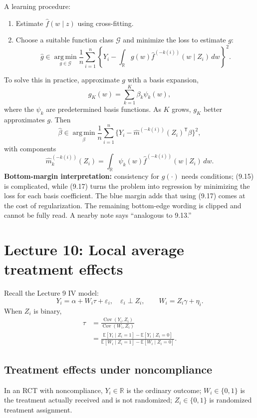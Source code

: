 A learning procedure:
\begin{enumerate}
 \item Estimate $\widehat f(w\mid z)$ using cross-fitting.
 \item Choose a suitable function class $\mathcal G$ and minimize the loss to estimate $g$:
 \[
 \widehat g\in\operatorname*{arg\,min}_{g\in\mathcal G}
 \frac1n\sum_{i=1}^n\left\{
 Y_i-\int_{\mathbb R}g(w)\widehat f^{(-k(i))}(w\mid Z_i)\,dw
 \right\}^{\!2}.\tag{9.16}
 \]
\end{enumerate}
To solve this in practice, approximate $g$ with a basis expansion,
\[
 g_K(w)=\sum_{k=1}^K\beta_k\psi_k(w),
\]
where the $\psi_k$ are predetermined basis functions. As $K$ grows, $g_K$ better approximates $g$. Then
\[
 \widehat\beta\in\operatorname*{arg\,min}_\beta
 \frac1n\sum_{i=1}^n
 \{Y_i-\widehat m^{(-k(i))}(Z_i)^{\mathsf T}\beta\}^2,\tag{9.17}
\]
with components
\[
 \widehat m_k^{(-k(i))}(Z_i)=
 \int_{\mathbb R}\psi_k(w)\widehat f^{(-k(i))}(w\mid Z_i)\,dw.
\]
\textbf{Bottom-margin interpretation:} consistency for $g(\cdot)$ needs conditions; (9.15) is complicated, while (9.17) turns the problem into regression by minimizing the loss for each basis coefficient. The blue margin adds that using (9.17) comes at the cost of regularization. The remaining bottom-edge wording is clipped and cannot be fully read. A nearby note says ``analogous to 9.13.''

\section{Lecture 10: Local average treatment effects}
Recall the Lecture 9 IV model:
\[
 Y_i=\alpha+W_i\tau+\varepsilon_i,\quad\varepsilon_i\perp Z_i,
 \qquad W_i=Z_i\gamma+\eta_i.\tag{10.1}
\]
When $Z_i$ is binary,
\begin{align*}
 \tau&=\frac{\operatorname{Cov}(Y_i,Z_i)}{\operatorname{Cov}(W_i,Z_i)}\\
 &=\frac{\mathbb E[Y_i\mid Z_i=1]-\mathbb E[Y_i\mid Z_i=0]}
 {\mathbb E[W_i\mid Z_i=1]-\mathbb E[W_i\mid Z_i=0]}.\tag{10.2}
\end{align*}

\subsection{Treatment effects under noncompliance}
In an RCT with noncompliance, $Y_i\in\mathbb R$ is the ordinary outcome; $W_i\in\{0,1\}$ is the treatment actually received and is not randomized; $Z_i\in\{0,1\}$ is randomized treatment assignment.

